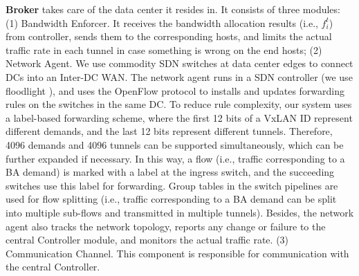 \documentclass[sigconf]{acmart}
\begin{document}
\textbf{Broker} takes care of the data center it resides in. It consists of three modules:
(1) Bandwidth Enforcer.
It receives the bandwidth allocation results (i.e., $f_i^t$) from controller, sends them to the corresponding hosts, and limits the actual traffic rate in each tunnel in case something is wrong on the end hosts;
(2) Network Agent.
We use commodity SDN switches at data center edges to connect DCs into an Inter-DC WAN.
The network agent runs in a SDN controller (we use floodlight \cite{floodlight}), 
and uses the OpenFlow \cite{openflow} protocol to installs and updates forwarding rules 
on the switches in the same DC. 
To reduce rule complexity, our system uses a label-based forwarding scheme, 
where the first 12 bits of a VxLAN ID represent different demands, 
and the last 12 bits represent different tunnels.
Therefore, 4096 demands and 4096 tunnels can be supported simultaneously, 
which can be further expanded if necessary. 
In this way, a flow (i.e., traffic corresponding to a BA demand) is marked with a label at the ingress switch, and the succeeding switches use this label for forwarding.
Group tables in the switch pipelines are used for flow splitting (i.e., traffic corresponding to a BA demand 
can be split into multiple sub-flows and transmitted in multiple tunnels).
Besides, the network agent also tracks the network topology, reports any change or failure to the central Controller module, and monitors the actual traffic rate. 
(3) Communication Channel.
This component is responsible for communication with the central Controller.
\end{document}
